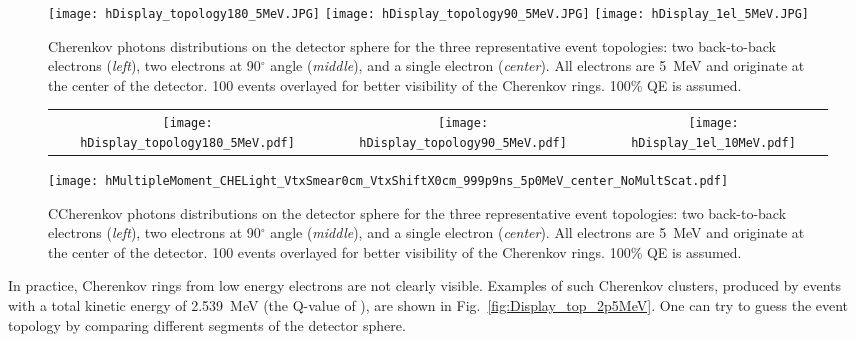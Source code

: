 \begin{figure*}[h]
  \centering
  \texttt{[image: hDisplay\_topology180\_5MeV.JPG]}
  \texttt{[image: hDisplay\_topology90\_5MeV.JPG]}
  \texttt{[image: hDisplay\_1el\_5MeV.JPG]}
  \caption{Cherenkov photons distributions on the detector sphere for
    the three representative event topologies: two back-to-back
    electrons (\emph{left}), two electrons at 90$^{\circ}$ angle
    (\emph{middle}), and a single electron (\emph{center}).  All
    electrons are 5~MeV and originate at the center of the
    detector. 100 events overlayed for better visibility of the
    Cherenkov rings. 100\% QE is assumed. }
  \label{fig:Display_top_5MeV}
\end{figure*}


\begin{figure*}[h]
  \centering
  \begin{tabular}{c c c}
  \texttt{[image: hDisplay\_topology180\_5MeV.pdf]} &
  \texttt{[image: hDisplay\_topology90\_5MeV.pdf]} &
  \texttt{[image: hDisplay\_1el\_10MeV.pdf]} \\
  \end{tabular}
  \texttt{[image: hMultipleMoment\_CHELight\_VtxSmear0cm\_VtxShiftX0cm\_999p9ns\_5p0MeV\_center\_NoMultScat.pdf]}
  \caption{CCherenkov photons distributions on the detector sphere for
    the three representative event topologies: two back-to-back
    electrons (\emph{left}), two electrons at 90$^{\circ}$ angle
    (\emph{middle}), and a single electron (\emph{center}).  All
    electrons are 5~MeV and originate at the center of the
    detector. 100 events overlayed for better visibility of the
    Cherenkov rings. 100\% QE is assumed. }
  \label{fig:Event_Topology}
\end{figure*}

In practice, Cherenkov rings from low energy electrons are not clearly visible. Examples of such Cherenkov clusters, produced by events with a total kinetic energy of 2.539~MeV (the Q-value of \Te), are shown in Fig.~\ref{fig:Display_top_2p5MeV}. One can try to guess the event topology by comparing different segments of the detector sphere.

